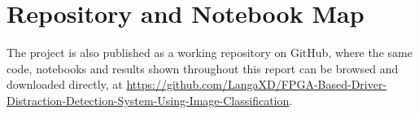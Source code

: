 \chapter{Repository and Notebook Map}
\label{app:repo}

The project is also published as a working repository on GitHub, where the same code, notebooks and results shown throughout this report can be browsed and downloaded directly, at \url{https://github.com/LangaXD/FPGA-Based-Driver-Distraction-Detection-System-Using-Image-Classification}.




